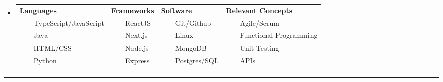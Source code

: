 \documentclass[10pt,a4paper]{article}
\newcommand{\tabitem}{~~\llap{--}~~}
\newenvironment{indentsection}[1]%
{\begin{list}{}%
	{\setlength{\leftmargin}{1.7#1}}%
	\item[]%
}
{\end{list}}
\begin{document}
\vspace{-0.2em}

\begin{itemize}[leftmargin=*]
	\parskip=0.1em	

\item[]

\begin{tabularx}{\textwidth}{X X X X}

\textbf{Languages} & \textbf{Frameworks} & \textbf{Software} & \textbf{Relevant Concepts}\\
\tabitem TypeScript/JavaScript & \tabitem ReactJS & \tabitem Git/Github & \tabitem Agile/Scrum \\
\tabitem Java & \tabitem Next.js & \tabitem Linux & \tabitem Functional Programming \\	
\tabitem HTML/CSS & \tabitem Node.js  & \tabitem MongoDB & \tabitem Unit Testing \\
\tabitem Python & \tabitem Express & \tabitem Postgres/SQL & \tabitem APIs \\
\\




\end{tabularx}

\end{itemize}



\vspace{-1.1em}
\hrule %
\vspace{-0.4em}
\end{document}
